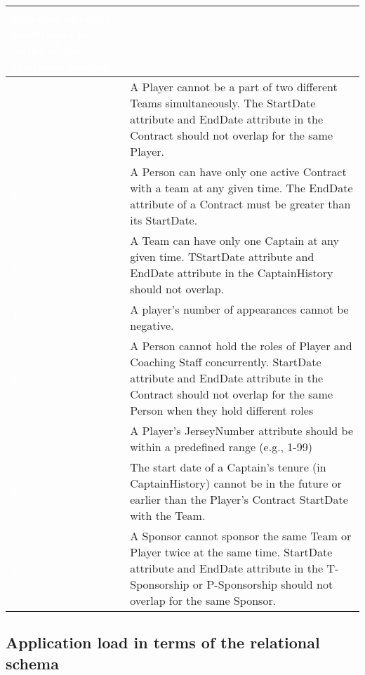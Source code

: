 \begin{table}[H]
  \def\arraystretch{1.25}%
  \centering
  \begin{tabular}{|>{\columncolor{myColor}}  m{1.5cm} | m{13.5cm}| }
    \hline
    \rowcolor{myColor}
    \multicolumn{2}{| c |}  {\textcolor{white}{\large \textbf{External integrity constraints in terms of the relational schema}}} \\
    \hline
     {\textcolor{white}{\textbf{1}}} & A Player cannot be a part of two different Teams simultaneously. The StartDate attribute and EndDate attribute in the Contract should not overlap for the same Player. \\
    \hline
     {\textcolor{white}{\textbf{2}}} & A Person can have only one active Contract with a team at any given time. The EndDate attribute of a Contract must be greater than its StartDate.\\
    \hline
     {\textcolor{white}{\textbf{3}}} & A Team can have only one Captain at any given time. TStartDate attribute and EndDate attribute in the CaptainHistory should not overlap. \\
    \hline
     {\textcolor{white}{\textbf{4}}} & A player’s number of appearances cannot be negative.\\
    \hline
     {\textcolor{white}{\textbf{5}}} & A Person cannot hold the roles of Player and Coaching Staff concurrently. StartDate attribute and EndDate attribute in the Contract should not overlap for the same Person when they hold different roles\\
    \hline
     {\textcolor{white}{\textbf{6}}} & A Player’s JerseyNumber attribute should be within a predefined range (e.g., 1-99) \\
    \hline
     {\textcolor{white}{\textbf{7}}} & The start date of a Captain’s tenure (in CaptainHistory) cannot be in the future or earlier than the Player’s Contract StartDate with the Team.\\
    \hline
    {\textcolor{white}{\textbf{8}}} & A Sponsor cannot sponsor the same Team or Player twice at the same time. StartDate attribute and EndDate attribute in the T-Sponsorship or P-Sponsorship should not overlap for the same Sponsor. \\
    \hline
  \end{tabular}\label{tab:table10}
\end{table}


\pagebreak

\subsection{Application load in terms of the relational schema}

